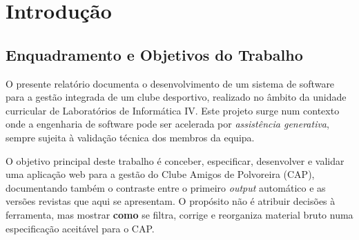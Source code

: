 \documentclass[a4paper,12pt]{scrreprt}
\begin{document}
\pagebreak



\renewcommand{\contentsname}{Índice}

\tableofcontents

\pagebreak

\listoffigures





\chapter{Introdução}

\section{Enquadramento e Objetivos do Trabalho}

O presente relatório documenta o desenvolvimento de um sistema de software para a gestão integrada de um clube desportivo, realizado no âmbito da unidade curricular de Laboratórios de Informática IV. Este projeto surge num contexto onde a engenharia de software pode ser acelerada por \textit{assistência generativa}, sempre sujeita à validação técnica dos membros da equipa.

O objetivo principal deste trabalho é conceber, especificar, desenvolver e validar uma aplicação web para a gestão do Clube Amigos de Polvoreira (CAP), documentando também o contraste entre o primeiro \textit{output} automático e as versões revistas que aqui se apresentam. O propósito não é atribuir decisões à ferramenta, mas mostrar \textbf{como} se filtra, corrige e reorganiza material bruto numa especificação aceitável para o CAP.
\end{document}
